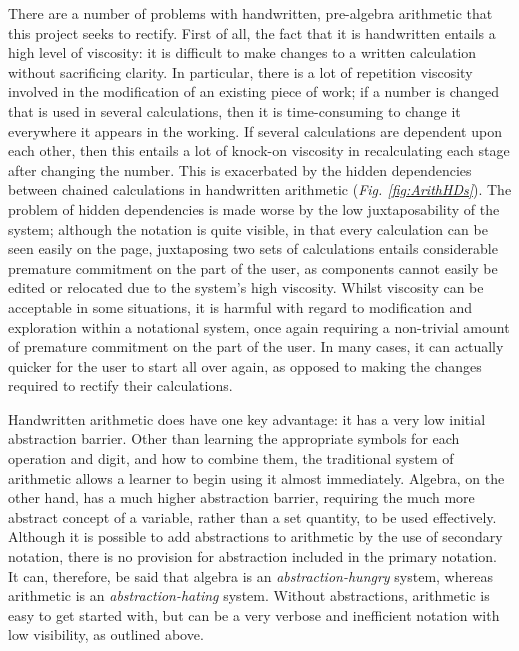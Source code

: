 \documentclass[12pt,twoside,notitlepage,xetex]{report}
\begin{document}
There are a number of problems with handwritten, pre-algebra arithmetic that
this project seeks to rectify.  First of all, the fact that it is handwritten
entails a high level of viscosity: it is difficult to make changes to a written
calculation without sacrificing clarity.  In particular, there is a lot of
repetition viscosity involved in the modification of an existing piece of work;
if a number is changed that is used in several calculations, then it is
time-consuming to change it everywhere it appears in the working.  If several
calculations are dependent upon each other, then this entails a lot of knock-on
viscosity in recalculating each stage after changing the number.  This is
exacerbated by the hidden dependencies between chained calculations in
handwritten arithmetic (\emph{Fig. \ref{fig:ArithHDs}}).  The problem of hidden dependencies
is made worse by the low juxtaposability of the system; although the notation
is quite visible, in that every calculation can be seen easily on the page,
juxtaposing two sets of calculations entails considerable premature commitment
on the part of the user, as components cannot easily be edited or relocated due
to the system's high viscosity.  Whilst viscosity can be acceptable in some
situations, it is harmful with regard to modification and exploration within a
notational system, once again requiring a non-trivial amount of premature
commitment on the part of the user.  In many cases, it can actually quicker for
the user to start all over again, as opposed to making the changes required to
rectify their calculations.

Handwritten arithmetic does have one key advantage: it has a very low initial
abstraction barrier.  Other than learning the appropriate symbols for each
operation and digit, and how to combine them, the traditional system of
arithmetic allows a learner to begin using it almost immediately.  Algebra, on
the other hand, has a much higher abstraction barrier, requiring the much more
abstract concept of a variable, rather than a set quantity, to be used
effectively.  Although it is possible to add abstractions to arithmetic by the
use of secondary notation, there is no provision for abstraction included in
the primary notation.  It can, therefore, be said that algebra is an
\emph{abstraction-hungry} system, whereas arithmetic is an
\emph{abstraction-hating} system.  Without abstractions, arithmetic is easy to
get started with, but can be a very verbose and inefficient notation with low
visibility, as outlined above.
\end{document}
